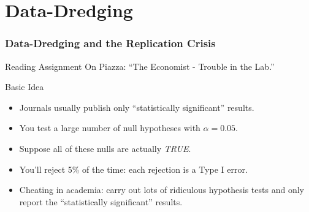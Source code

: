 \section{Data-Dredging}
\begin{frame}
  \frametitle{Data-Dredging and the Replication Crisis}

\begin{block}{Reading Assignment}
  On Piazza: ``The Economist - Trouble in the Lab.'' 
\end{block}

\begin{block}{Basic Idea}
  \begin{itemize}
    \item Journals usually publish only ``statistically significant'' results.
    \item You test a large number of null hypotheses with $\alpha= 0.05$.
    \item Suppose all of these nulls are actually \emph{TRUE}.
    \item You'll reject 5\% of the time: each rejection is a Type I error.
    \item Cheating in academia: carry out lots of ridiculous hypothesis tests and only report the ``statistically significant'' results. 
  \end{itemize}
\end{block}
    


\end{frame}
%
